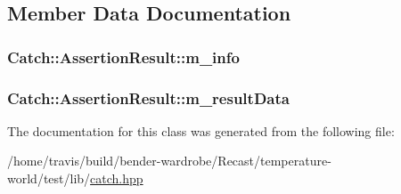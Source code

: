 \subsection{Member Data Documentation}
\hypertarget{class_catch_1_1_assertion_result_a3e7236f73a51d6fc8bb9dfdefcee7772}{
\subsubsection[{m\-\_\-info}]{ Catch\-::\-Assertion\-Result\-::m\-\_\-info\hspace{0.3cm}{\ttfamily [protected]}}}\label{class_catch_1_1_assertion_result_a3e7236f73a51d6fc8bb9dfdefcee7772}
\hypertarget{class_catch_1_1_assertion_result_add3455b8bbedb0d643e18da67c66b4f7}{
\subsubsection[{m\-\_\-result\-Data}]{ Catch\-::\-Assertion\-Result\-::m\-\_\-result\-Data\hspace{0.3cm}{\ttfamily [protected]}}}\label{class_catch_1_1_assertion_result_add3455b8bbedb0d643e18da67c66b4f7}


The documentation for this class was generated from the following file\-:\begin{DoxyCompactItemize}
\item 
/home/travis/build/bender-\/wardrobe/\-Recast/temperature-\/world/test/lib/\hyperlink{catch_8hpp}{catch.\-hpp}\end{DoxyCompactItemize}
